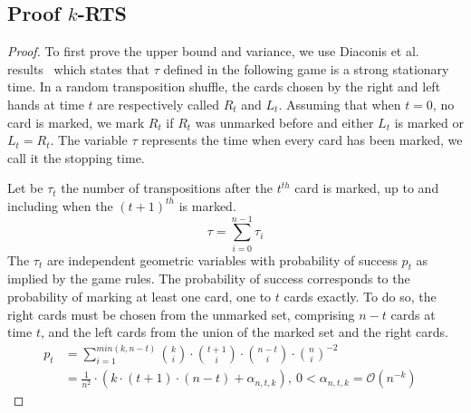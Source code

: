 \documentclass{llncs}
\begin{document}
\subsection{Proof $k$-RTS}\label{proof:kRTS}
\begin{proof}
To first prove the upper bound and variance, we use Diaconis et al. results~\cite{aldous1986shuffling} which states that $\tau$ defined in the following game is a strong stationary time.
In a random transposition shuffle, the cards chosen by the right and left hands at time $t$ are respectively called $R_t$ and $L_t$. Assuming that when $t=0$, no card is marked, we mark $R_t$ if
$R_t$ was unmarked before and either $L_t$ is marked or $L_t = R_t$. The variable $\tau$ represents the time when every card has been marked, we call it the stopping time.

Let be $\tau_t$ the number of transpositions after the $t^{th}$ card is marked, up to and including when the $(t+1)^{th}$ is marked. $$\tau = \sum_{i=0}^{n-1} \tau_i$$
The $\tau_t$ are independent geometric variables with probability of success $p_t$ as implied by the game rules.
The probability of success corresponds to the probability of marking at least one card, one to $t$ cards exactly. To do so, the right cards must be chosen from the unmarked set, comprising $n-t$ cards at time $t$,
and the left cards from the union of the marked set and the right cards.
\begin{align*}
 p_t &= \sum_{i=1}^{min(k,n-t)} {k \choose i} \cdot {t+1 \choose i} \cdot {n-t \choose i}\cdot{n \choose i}^{-2}&\\
 &= \frac{1}{n^2} \cdot \left ( k \cdot (t+1)\cdot(n-t) + \alpha_{n,t,k}\right ),\ 0 < \alpha_{n,t,k} = \mathcal{O}\left(n^{-k}\right )
\end{align*}


\end{proof}
\end{document}
